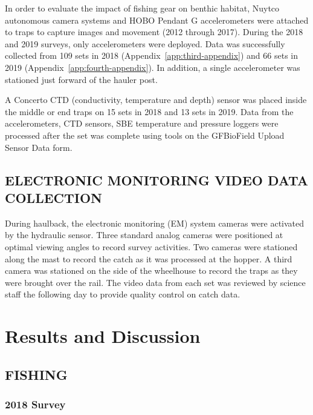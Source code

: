 \documentclass[12pt]{article}\usepackage[]{graphicx}\usepackage[]{color}
\begin{document}
In order to evaluate the impact of fishing gear on benthic habitat, Nuytco autonomous camera systems and HOBO Pendant G accelerometers were attached to traps to capture images and movement (2012 through 2017). During the 2018 and 2019 surveys, only accelerometers were deployed. Data was successfully collected from 109 sets in 2018 (Appendix~\ref{app:third-appendix}) and 66 sets in 2019 (Appendix~\ref{app:fourth-appendix}). In addition, a single accelerometer was stationed just forward of the hauler post.

A Concerto CTD (conductivity, temperature and depth) sensor was placed inside the middle or end traps on 15 sets in 2018 and 13 sets in 2019. Data from the accelerometers, CTD sensors, SBE temperature and pressure loggers were processed after the set was complete using tools on the GFBioField Upload Sensor Data form.

\hypertarget{electronic-monitoring-video-data-collection}{%
\subsection{ELECTRONIC MONITORING VIDEO DATA COLLECTION}\label{electronic-monitoring-video-data-collection}}

During haulback, the electronic monitoring (EM) system cameras were activated by the hydraulic sensor. Three standard analog cameras were positioned at optimal viewing angles to record survey activities. Two cameras were stationed along the mast to record the catch as it was processed at the hopper. A third camera was stationed on the side of the wheelhouse to record the traps as they were brought over the rail. The video data from each set was reviewed by science staff the following day to provide quality control on catch data.

\clearpage

\hypertarget{results-and-discussion}{%
\section{Results and Discussion}\label{results-and-discussion}}

\hypertarget{fishing}{%
\subsection{FISHING}\label{fishing}}

\hypertarget{survey}{%
\subsubsection{2018 Survey}\label{survey}}
\end{document}
